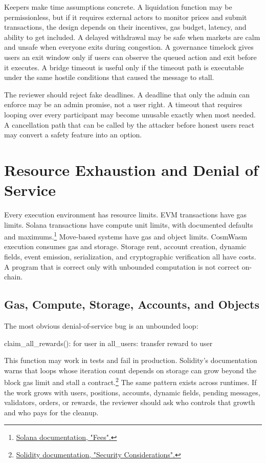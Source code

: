 Keepers make time assumptions concrete. A liquidation function may be permissionless, but if it requires external actors to monitor prices and submit transactions, the design depends on their incentives, gas budget, latency, and ability to get included. A delayed withdrawal may be safe when markets are calm and unsafe when everyone exits during congestion. A governance timelock gives users an exit window only if users can observe the queued action and exit before it executes. A bridge timeout is useful only if the timeout path is executable under the same hostile conditions that caused the message to stall.

The reviewer should reject fake deadlines. A deadline that only the admin can enforce may be an admin promise, not a user right. A timeout that requires looping over every participant may become unusable exactly when most needed. A cancellation path that can be called by the attacker before honest users react may convert a safety feature into an option.

\section{Resource Exhaustion and Denial of Service}

Every execution environment has resource limits. EVM transactions have gas limits. Solana transactions have compute unit limits, with documented defaults and maximums.\footnote{\href{https://solana.com/docs/core/fees}{Solana documentation, "Fees".}} Move-based systems have gas and object limits. CosmWasm execution consumes gas and storage. Storage rent, account creation, dynamic fields, event emission, serialization, and cryptographic verification all have costs. A program that is correct only with unbounded computation is not correct on-chain.

\subsection{Gas, Compute, Storage, Accounts, and Objects}

The most obvious denial-of-service bug is an unbounded loop:

\begin{codeblock}
claim_all_rewards():
    for user in all_users:
        transfer reward to user
\end{codeblock}

This function may work in tests and fail in production. Solidity's documentation warns that loops whose iteration count depends on storage can grow beyond the block gas limit and stall a contract.\footnote{\href{https://docs.soliditylang.org/en/latest/security-considerations.html}{Solidity documentation, "Security Considerations".}} The same pattern exists across runtimes. If the work grows with users, positions, accounts, dynamic fields, pending messages, validators, orders, or rewards, the reviewer should ask who controls that growth and who pays for the cleanup.


